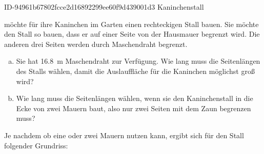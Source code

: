\begin{exercise}
      {ID-94961b67802fcce2d16892299ee60f9d439001d3}
      {Kaninchenstall}
  \ifproblem\problem\par
    \xxa{} möchte für ihre Kaninchen im Garten einen rechteckigen Stall
    bauen. Sie möchte den Stall so bauen, dass er auf einer Seite von der
    Hausmauer begrenzt wird. Die anderen drei Seiten werden durch Maschendraht
    begrenzt.
    \begin{enumerate}[a)]
      \item Sie hat \SI{16.8}{\metre} Maschendraht zur Verfügung. Wie lang muss
            \xxa{} die Seitenlängen des Stalls wählen, damit die Auslauffläche für
            die Kaninchen möglichst groß wird?
      \item Wie lang muss \xxa{} die Seitenlängen wählen, wenn sie den
            Kaninchenstall in die Ecke von zwei Mauern baut, also nur zwei
            Seiten mit dem Zaun begrenzen muss?
    \end{enumerate}
  \fi
  \ifoutline\outline\par
    Je nachdem ob \xxa{} eine oder zwei Mauern nutzen kann,
    ergibt sich für den Stall folgender Grundriss:
    \begin{center}
\end{center}
\end{exercise}
